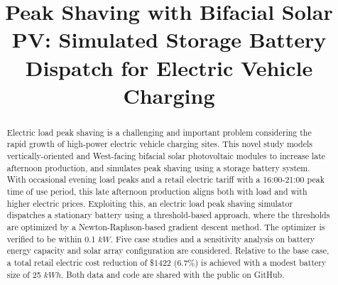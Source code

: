 \documentclass[conference]{IEEEtran}
\begin{document}
\title{Peak Shaving with Bifacial Solar PV: Simulated Storage Battery Dispatch for Electric Vehicle Charging}

\author{
\and
{}
\and
{}
}

\maketitle

\begin{abstract}
Electric load peak shaving is a challenging and important problem considering the rapid growth of high-power electric vehicle charging sites. This novel study models vertically-oriented and West-facing bifacial solar photovoltaic modules to increase late afternoon production, and simulates peak shaving using a storage battery system. With occasional evening load peaks and a retail electric tariff with a 16:00-21:00 peak time of use period, this late afternoon production aligns both with load and with higher electric prices. Exploiting this, an electric load peak shaving simulator dispatches a stationary battery using a threshold-based approach, where the thresholds are optimized by a Newton-Raphson-based gradient descent method. The optimizer is verified to be within 0.1 $kW$. Five case studies and a sensitivity analysis on battery energy capacity and solar array configuration are considered. Relative to the base case, a total retail electric cost reduction of \$1422 (6.7\%) is achieved with a modest battery size of 25 $kWh$. Both data and code are shared with the public on GitHub.
\end{abstract}
\end{document}
